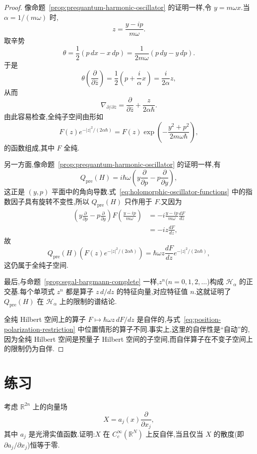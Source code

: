 \begin{proof}
像命题~\ref{prop:prequantum-harmonic-oscillator} 的证明一样,令 $y=m\omega x$.当 $\alpha=1/(m\omega)$ 时,
\[
 z=\frac{y-ip}{m\omega}.
\]
取辛势
\[
 \theta=\frac12(p\,dx-x\,dp)
 =\frac{1}{2m\omega}(p\,dy-y\,dp).
\]
于是
\[
 \theta\left(\frac{\partial}{\partial\bar z}\right)
 =\frac12\left(p+\frac{i}{\alpha}x\right)
 =\frac{i}{2\alpha}z,
\]
从而
\[
 \nabla_{\partial/\partial\bar z}
 =\frac{\partial}{\partial\bar z}+\frac{z}{2\alpha\hbar}.
\]
由此容易检查,全纯子空间由形如
\[
 F(z)e^{-|z|^2/(2\alpha\hbar)}
 =F(z)\exp\left(-\frac{y^2+p^2}{2m\omega\hbar}\right),
 \label{eq:holomorphic-oscillator-functions}
\]
的函数组成,其中 $F$ 全纯.

另一方面,像命题~\ref{prop:prequantum-harmonic-oscillator} 的证明一样,有
\[
 Q_{\mathrm{pre}}(H)=i\hbar\omega
 \left(y\frac{\partial}{\partial p}-p\frac{\partial}{\partial y}\right),
\]
这正是 $(y,p)$ 平面中的角向导数.式~\eqref{eq:holomorphic-oscillator-functions} 中的指数因子具有旋转不变性,所以 $Q_{\mathrm{pre}}(H)$ 只作用于 $F$.又因为
\[
 \begin{aligned}
 \left(y\frac{\partial}{\partial p}-p\frac{\partial}{\partial y}\right)
 F\left(\frac{y-ip}{m\omega}\right)
 &=-i\frac{y-ip}{m\omega}\frac{dF}{dz}\\
 &=-iz\frac{dF}{dz},
 \end{aligned}
\]
故
\[
 Q_{\mathrm{pre}}(H)\left(F(z)e^{-|z|^2/(2\alpha\hbar)}\right)
 =\hbar\omega z\frac{dF}{dz}e^{-|z|^2/(2\alpha\hbar)},
\]
这仍属于全纯子空间.

最后,与命题~\ref{prop:segal-bargmann-complete} 一样,$z^n$($n=0,1,2,\ldots$)构成 $\mathcal H_\alpha$ 的正交基.每个单项式 $z^n$ 都是算子 $z\,d/dz$ 的特征向量,对应特征值 $n$.这就证明了 $Q_{\mathrm{pre}}(H)$ 在 $\mathcal H_\alpha$ 上的限制的谱结论.

全纯 Hilbert 空间上的算子 $F\mapsto\hbar\omega z\,dF/dz$ 是自伴的,与式~\eqref{eq:position-polarization-restriction} 中位置情形的算子不同.事实上,这里的自伴性是“自动”的,因为全纯 Hilbert 空间是预量子 Hilbert 空间的子空间,而自伴算子在不变子空间上的限制仍为自伴.
\end{proof}

\section{练习}
\label{sec:geometric-quantization-euclidean-exercises}

\begin{exercise}[散度与反自伴性]\label{ex:divergence-skew-adjoint}
考虑 $\mathbb R^{2n}$ 上的向量场
\[
 X=a_j(x)\frac{\partial}{\partial x_j},
\]
其中 $a_j$ 是光滑实值函数.证明:$X$ 在 $C_c^\infty(\mathbb R^N)$ 上反自伴,当且仅当 $X$ 的散度(即 $\partial a_j/\partial x_j$)恒等于零.
\end{exercise}

